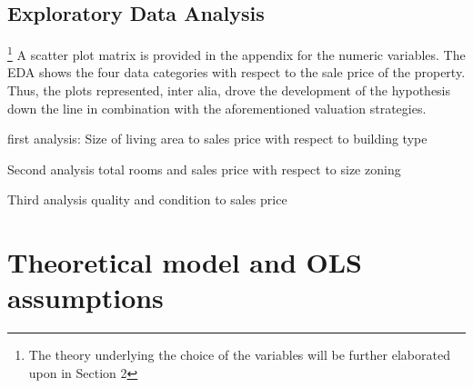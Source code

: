 \documentclass{article}
\begin{document}
\subsection{Exploratory Data Analysis}\footnote{The theory underlying the choice of the variables will be further elaborated upon in Section 2}
A scatter plot matrix is provided in the appendix for the numeric variables. The EDA shows the four data categories with respect to the sale price of the property. Thus, the plots represented, inter alia, drove the development of the hypothesis down the line in combination with the aforementioned valuation strategies. 



first analysis:
Size of living area to sales price with respect to building type

Second analysis
total rooms and sales price with respect to size zoning

Third analysis
quality and condition to sales price



\section{Theoretical model and OLS assumptions}




\end{document}
